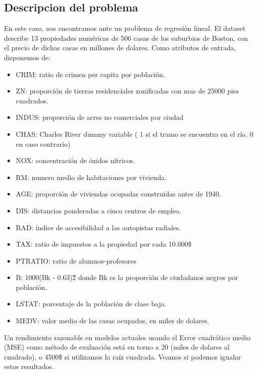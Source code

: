 \subsection{Descripcion del problema}
En este caso, nos encontramos ante un problema de regresión lineal. El dataset describe 13 propiedades numéricas de 506 casas de los suburbios de Boston, con el precio de dichas casas en millones de dolares. Como atributos de entrada, disponemos de:
\begin{itemize}[noitemsep]
\item CRIM: ratio de crimen per capita por población.
\item ZN: proporción de tierras residenciales zonificadas con mas de 25000 pies cuadrados.
\item INDUS: proporción de acres no comerciales por ciudad
\item CHAS: Charles River dummy variable ( 1 si el tramo se encuentra en el río, 0 en caso contrario)
\item NOX: concentración de óxidos nítricos.
\item RM: numero medio de habitaciones por vivienda.
\item AGE: proporción de viviendas ocupadas construidas antes de 1940.
\item DIS: distancias ponderadas a cinco centros de empleo.
\item RAD: índice de accesibilidad a las autopistas radiales.
\item TAX: ratio de impuestos a la propiedad por cada 10.000\$
\item PTRATIO: ratio de alumnos-profesores
\item B: 1000(Bk - 0.63)\^2 donde Bk es la proporción de ciudadanos negros por población.
\item LSTAT: porcentaje de la población de clase baja.
\item MEDV: valor medio de las casas ocupadas, en miles de dolares.
\end{itemize}
Un rendimiento razonable en modelos actuales usando el Error cuadrático medio (MSE) como método de evaluación está en torno a 20 (miles de dolares al cuadrado), o 4500\$ si utilizamos la raíz cuadrada. Veamos si podemos igualar estos resultados.
